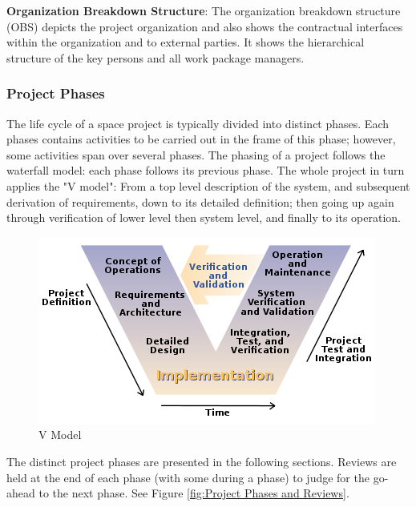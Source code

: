 \textbf{Organization Breakdown Structure}: The organization breakdown structure (OBS) depicts the project organization and also shows the contractual interfaces within the organization and to external parties. It shows the hierarchical structure of the key persons and all work package managers.

\subsubsection{Project Phases}

The life cycle of a space project is typically divided into distinct phases. Each phases contains activities to be carried out in the frame of this phase; however, some activities span over several phases. The phasing of a project follows the waterfall model: each phase follows its previous phase. The whole project in turn applies the "V model": From a top level description of the system, and subsequent derivation of requirements, down to its detailed definition; then going up again through verification of lower level then system level, and finally to its operation.

\begin{figure}[h]
\centering\includegraphics[scale=0.8]{fig/v_model}
\caption{V Model}
\label{fig:V Model}
\end{figure}

The distinct project phases are presented in the following sections. Reviews are held at the end of each phase (with some during a phase) to judge for the go-ahead to the next phase. See Figure \ref{fig:Project Phases and Reviews}.

